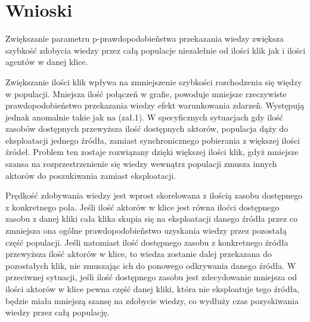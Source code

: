\section{Wnioski}

Zwiększanie parametru p-prawdopodobieñstwa przekazania wiedzy zwiększa szybkość zdobycia wiedzy przez całą populacje niezalełnie od ilości klik jak i ilości agentów w danej klice.

Zwiększanie ilości klik wpływa na zmniejszenie szybkości rozchodzenia się więdzy w populacji. Mniejsza ilość połączeń w grafie, powoduje mniejsze rzeczywiste prawdopodobieństwo przekazania wiedzy efekt warunkowania zdarzeñ. Występują jednak anomalnie takie jak na (zał.1). W specyficznych sytuacjach gdy ilość zasobów dostępnych przewyższa ilość dostępnych aktorów, populacja dąży do eksploatacji jednego źródła, zamiast synchronicznego pobierania z większej ilości źródeł. Problem ten zostaje rozwiązany dzięki większej ilości klik, gdyż mniejsze szansa na rozprzestrzenienie się wiedzy wewnątrz populacji zmusza innych aktorów do poszukiwania zamiast eksploatacji.


Prędkość zdobywania wiedzy jest wprost skorelowana z ilością zasobu dostępnego z konkretnego pola. Jeśli ilość aktorów w klice jest równa iloćci dostępnego zasobu z danej kliki cała klika skupia się na eksploatacji danego źródła przez co zmniejsza ona ogólne prawdopodobieñstwo uzyskania wiedzy przez pozostałą część populacji. Jeśli natomiast ilość dostępnego zasobu z konkretnego źródła przewyższa ilość aktorów w klice, to wiedza zostanie dalej przekazana do pozostałych klik, nie zmuszając ich do ponowego odkrywania danego źródła. W przeciwnej sytuacji, jeśli ilość dostępnego zasobu jest zdecydowanie mniejsza od ilości aktorów w klice pewna część danej kliki, która nie eksploatuje tego źródła, będzie miała mniejszą szansę na zdobycie wiedzy, co wydłuży czas pozyskiwania wiedzy przez całą populację.

